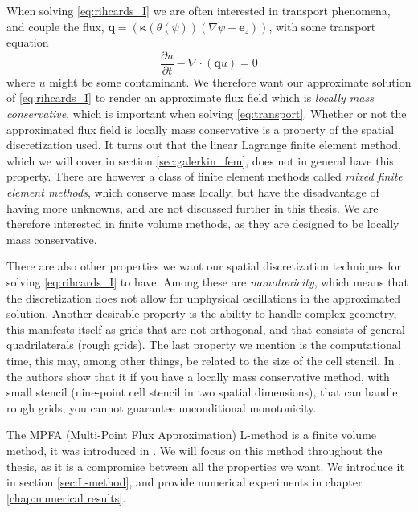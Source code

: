 \documentclass[../Main/main.tex]{subfiles}
\begin{document}
\par 
When solving \eqref{eq:rihcards_I} we are often interested in transport phenomena, and couple the flux, $\bm{q}=(\bm{\kappa} (\theta (\psi))(\nabla \psi + \bm{e}_z))$, with some transport equation
\begin{equation}\label{eq:transport}
	\frac{\partial u}{\partial t} - \nabla \cdot (\bm{q}u) = 0
\end{equation}
where $u$ might be some contaminant. We therefore want our approximate solution of \eqref{eq:rihcards_I} to render an approximate flux field which is \emph{locally mass conservative}, which is important when solving \eqref{eq:transport}. Whether or not the approximated flux field is locally mass conservative is a property of the spatial discretization used. It turns out that the linear Lagrange finite element method, which we will cover in section \ref{sec:galerkin_fem}, does not in general have this property. There are however a class of finite element methods called \emph{mixed finite element methods}, which conserve mass locally, but have the disadvantage of having more unknowns, and are not discussed further in this thesis. We are therefore interested in finite volume methods, as they are designed to be locally mass conservative.
\par
There are also other properties we want our spatial discretization techniques for solving \eqref{eq:rihcards_I} to have. Among these are \emph{monotonicity}, which means that the discretization does not allow for unphysical oscillations in the approximated solution. Another desirable property is the ability to handle complex geometry, this manifests itself as grids that are not orthogonal, and that consists of general quadrilaterals (rough grids). The last property we mention is the computational time, this may, among other things, be related to the size of the cell stencil. In \cite{10.1007/s00211-006-0060-z}, the authors show that it if you have a locally mass conservative method, with small stencil (nine-point cell stencil in two spatial dimensions), that can handle rough grids, you cannot guarantee unconditional monotonicity.
\par 
The MPFA (Multi-Point Flux Approximation) L-method is a finite volume method, it was introduced in \cite{https://doi.org/10.1002/num.20320}. We will focus on this method throughout the thesis, as it is a compromise between all the properties we want. We introduce it in section \ref{sec:L-method}, and provide numerical experiments in chapter \ref{chap:numerical results}. 
\par 
\end{document}
